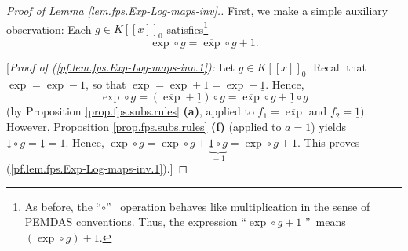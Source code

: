 \begin{proof}
[Proof of Lemma \ref{lem.fps.Exp-Log-maps-inv}.]First, we make a simple
auxiliary observation: Each $g\in K\left[  \left[  x\right]  \right]  _{0}$
satisfies\footnote{As before, the \textquotedblleft$\circ$\textquotedblright%
\ operation behaves like multiplication in the sense of PEMDAS conventions.
Thus, the expression \textquotedblleft$\overline{\exp}\circ g+1$%
\textquotedblright\ means $\left(  \overline{\exp}\circ g\right)  +1$.}%
\begin{equation}
\exp\circ g=\overline{\exp}\circ g+1. \label{pf.lem.fps.Exp-Log-maps-inv.1}%
\end{equation}


[\textit{Proof of (\ref{pf.lem.fps.Exp-Log-maps-inv.1}):} Let $g\in K\left[
\left[  x\right]  \right]  _{0}$. Recall that $\overline{\exp}=\exp-1$, so
that $\exp=\overline{\exp}+1=\overline{\exp}+\underline{1}$. Hence,%
\[
\exp\circ g=\left(  \overline{\exp}+\underline{1}\right)  \circ g=\overline
{\exp}\circ g+\underline{1}\circ g
\]
(by Proposition \ref{prop.fps.subs.rules} \textbf{(a)}, applied to
$f_{1}=\overline{\exp}$ and $f_{2}=\underline{1}$). However, Proposition
\ref{prop.fps.subs.rules} \textbf{(f)} (applied to $a=1$) yields
$\underline{1}\circ g=\underline{1}=1$. Hence, $\exp\circ g=\overline{\exp
}\circ g+\underbrace{\underline{1}\circ g}_{=1}=\overline{\exp}\circ g+1$.
This proves (\ref{pf.lem.fps.Exp-Log-maps-inv.1}).]


\end{proof}
